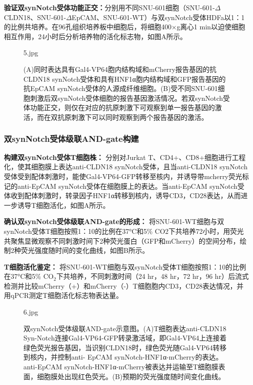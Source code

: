 \documentclass[12pt]{article}
\begin{document}
\textbf{验证双synNotch受体功能正交：}分别用不同SNU-601细胞（SNU-601-$\Delta$CLDN18、SNU-601-$\Delta$EpCAM、SNU-601-WT）与双synNotch受体HDFa以1：1的比例共培养。在96孔组织培养板中细胞后，将细胞400×g离心1 min以迫使细胞相互作用，24小时后分析培养物的活化标志物，如图\label{5}A所示。

\begin{figure}[h]
	\centering
	\begin{overpic}[width=0.8\columnwidth]{5.jpg}
	\end{overpic}
	\caption{(A)同时表达具有Gal4-VP64胞内结构域和mCherry报告基因的抗CLDN18 synNotch受体和具有HNF1α胞内结构域和GFP报告基因的抗EpCAM synNotch受体的人源成纤维细胞。(B)受不同SNU-601细胞刺激后双synNotch受体细胞的报告基因激活情况。若双synNotch受体功能正交，则仅在对应的抗原刺激下可观察到单一报告基因的激活，而在双抗原刺激下可以同时观察到两个报告基因的激活。}
	\label{5}
\end{figure}

\subsubsection{双synNotch受体级联AND-gate构建}

\textbf{构建双synNotch受体T细胞株：}
分别对Jurkat T、CD4+、CD8+细胞进行工程化，使其细胞膜上表达anti-CLDN18 synNotch受体，且当anti-CLDN18 synNotch受体受到配体刺激时，能使Gal4-VP64-GFP转移至核内，并诱导带mcherry荧光标记的anti-EpCAM synNotch受体在细胞膜上的表达。当anti-EpCAM synNotch受体收到配体刺激时，转录因子HNF1α转移到核内，诱导CD3，CD28表达，从而进一步诱导T细胞活化，如图\label{6}A所示。

\textbf{确认双synNotch受体级联AND-gate的形成：}
将SNU-601-WT细胞与双synNotch受体T细胞按照1：10的比例在37°C和5\% CO2下共培养72小时，用荧光共聚焦显微观察不同刺激时间下2种荧光蛋白（GFP和mCherry）的空间分布，绘制2种荧光强度随时间的变化曲线，如图\label{6}B所示。

\textbf{T细胞活化鉴定：}
将SNU-601-WT细胞与双synNotch受体T细胞按照1：10的比例在37°C和5\% $\mathrm{CO}_2$下共培养，不同刺激时间（24 hr，48 hr，72 hr，96 hr）后流式检测并比较mCherry（+）和mCherry（-）T细胞胞内CD3，CD28表达情况，并用qPCR测定T细胞活化标志物表达量。

\begin{figure}[h]
	\centering
	\begin{overpic}[width=0.8\columnwidth]{6.jpg}
	\end{overpic}
	\caption{双synNotch受体级联AND-gate示意图。(A)T细胞表达anti-CLDN18 Syn-Notch连接Gal4-VP64-GFP转录激活域，即Gal4-VP64上连接着绿色荧光报告基因，当识别CLDN18时，绿色荧光随Gal4-VP64转移到核内，并控制anti- EpCAM synNotch-HNF1α-mCherry的表达。anti-EpCAM synNotch-HNF1α-mCherry被表达并运输至T细胞膜表面，细胞膜处出现红色荧光。(B)预期的荧光强度随时间变化曲线。}
	\label{6}
	
\end{figure}
\end{document}
